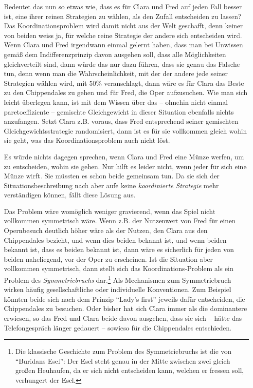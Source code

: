 Bedeutet das nun so etwas wie, dass es für Clara und Fred auf jeden Fall besser
ist, eine ihrer reinen Strategien zu wählen, als den Zufall entscheiden zu
lassen? Das Koordinationsproblem wird damit nicht aus der Welt geschafft, denn
keiner von beiden weiss ja, für welche reine Strategie der andere sich
entscheiden wird. Wenn Clara und Fred irgendwann einmal gelernt haben, dass man
bei Unwissen gemäß dem Indifferenzprinzip davon ausgehen soll, dass alle
Möglichkeiten gleichverteilt sind, dann würde das nur dazu führen, dass sie
genau das Falsche tun, denn wenn man die Wahrscheinlichkeit, mit der der andere
jede seiner Strategien wählen wird, mit 50\% veranschlagt, dann wäre es für
Clara das Beste zu den Chippendales zu gehen und für Fred, die Oper aufzusuchen.
Wie man sich leicht überlegen kann, ist mit dem Wissen über das -- ohnehin
nicht einmal paretoeffiziente -- gemischte Gleichgewicht in dieser Situation
ebenfalls nichts anzufangen. Setzt Clara z.B. voraus, dass Fred entsprechend
seiner gemischten Gleichgewichtsstrategie randomisiert, dann ist es für sie
vollkommen gleich wohin sie geht, was das Koordinationsproblem auch nicht löst. 

Es würde nichts dagegen sprechen, wenn Clara und Fred eine Münze werfen, um zu
entscheiden, wohin sie gehen. Nur hilft es leider nicht, wenn jeder für sich
eine Münze wirft. Sie müssten es schon beide gemeinsam tun. Da sie sich der
Situationsbeschreibung nach aber aufe keine {\em koordinierte Strategie} mehr
verständigen können, fällt diese Lösung aus. 

Das Problem wäre womöglich weniger gravierend, wenn das Spiel nicht vollkommen
symmetrisch wäre. Wenn z.B. der Nutzenwert von Fred für einen Opernbesuch
deutlich höher wäre als der Nutzen, den Clara aus den Chippendales bezieht, und
wenn dies beiden bekannt ist, und wenn beiden bekannt ist, dass es beiden
bekannt ist, dann wäre es sicherlich für jeden von beiden naheliegend, vor der
Oper zu erscheinen. Ist die Situation aber vollkommen symmetrisch, dann stellt
sich das Koordinations-Problem als ein Problem des {\em Symmetriebruchs}
dar.\footnote{Die klassische Geschichte zum Problem des Symmetriebruchs ist
die von "`Buridans Esel"': Der Esel steht genau in der Mitte zwischen zwei
gleich großen Heuhaufen, da er sich nicht entscheiden kann, welchen er fressen
soll, verhungert der Esel.} Als Mechanismen zum Symmetriebruch wirken häufig
gesellschaftliche oder individuelle Konventionen. Zum Beispiel könnten beide
sich nach dem Prinzip "`Lady's first"' jeweils dafür entscheiden, die
Chippendales zu besuchen. Oder bisher hat sich Clara immer als die dominantere
erwiesen, so das Fred und Clara beide davon ausgehen, dass sie sich -- hätte das
Telefongespräch länger gedauert -- sowieso für die Chippendales entschieden.

